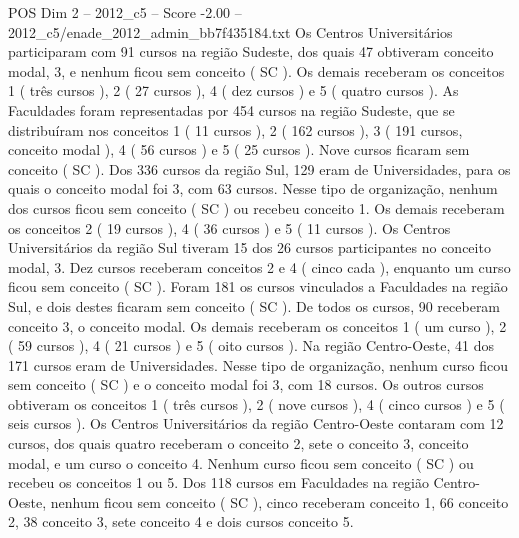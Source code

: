 \begin{textsample}{POS Dim 2 – 2012\_c5 – Score -2.00 – 2012\_c5/enade\_2012\_admin\_bb7f435184.txt}
Os Centros Universitários participaram com 91 cursos na região Sudeste, dos quais 47 obtiveram conceito modal, 3, e nenhum ficou sem conceito ( SC ).
Os demais receberam os conceitos 1 ( três cursos ), 2 ( 27 cursos ), 4 ( dez cursos ) e 5 ( quatro cursos ).
As Faculdades foram representadas por 454 cursos na região Sudeste, que se distribuíram nos conceitos 1 ( 11 cursos ), 2 ( 162 cursos ), 3 ( 191 cursos, conceito modal ), 4 ( 56 cursos ) e 5 ( 25 cursos ).
Nove cursos ficaram sem conceito ( SC ).
Dos 336 cursos da região Sul, 129 eram de Universidades, para os quais o conceito modal foi 3, com 63 cursos.
Nesse tipo de organização, nenhum dos cursos ficou sem conceito ( SC ) ou recebeu conceito 1.
Os demais receberam os conceitos 2 ( 19 cursos ), 4 ( 36 cursos ) e 5 ( 11 cursos ).
Os Centros Universitários da região Sul tiveram 15 dos 26 cursos participantes no conceito modal, 3.
Dez cursos receberam conceitos 2 e 4 ( cinco cada ), enquanto um curso ficou sem conceito ( SC ).
Foram 181 os cursos vinculados a Faculdades na região Sul, e dois destes ficaram sem conceito ( SC ).
De todos os cursos, 90 receberam conceito 3, o conceito modal.
Os demais receberam os conceitos 1 ( um curso ), 2 ( 59 cursos ), 4 ( 21 cursos ) e 5 ( oito cursos ).
Na região Centro-Oeste, 41 dos 171 cursos eram de Universidades.
Nesse tipo de organização, nenhum curso ficou sem conceito ( SC ) e o conceito modal foi 3, com 18 cursos.
Os outros cursos obtiveram os conceitos 1 ( três cursos ), 2 ( nove cursos ), 4 ( cinco cursos ) e 5 ( seis cursos ).
Os Centros Universitários da região Centro-Oeste contaram com 12 cursos, dos quais quatro receberam o conceito 2, sete o conceito 3, conceito modal, e um curso o conceito 4.
Nenhum curso ficou sem conceito ( SC ) ou recebeu os conceitos 1 ou 5.
Dos 118 cursos em Faculdades na região Centro-Oeste, nenhum ficou sem conceito ( SC ), cinco receberam conceito 1, 66 conceito 2, 38 conceito 3, sete conceito 4 e dois cursos conceito 5.

\end{textsample}
